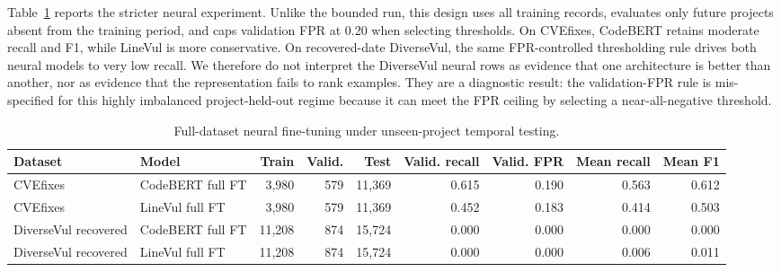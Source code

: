 \documentclass[a4paper,fleqn]{cas-dc}
\begin{document}
Table~\ref{tab:full-project-holdout} reports the stricter neural experiment.
Unlike the bounded run, this design uses all training records, evaluates only
future projects absent from the training period, and caps validation FPR at
0.20 when selecting thresholds. On CVEfixes, CodeBERT retains moderate recall
and F1, while LineVul is more conservative. On recovered-date DiverseVul, the
same FPR-controlled thresholding rule drives both neural models to very low
recall. We therefore do not interpret the DiverseVul neural rows as evidence
that one architecture is better than another, nor as evidence that the
representation fails to rank examples. They are a diagnostic result: the
validation-FPR rule is mis-specified for this highly imbalanced
project-held-out regime because it can meet the FPR ceiling by selecting a
near-all-negative threshold.

\begin{table}
\centering
\caption{Full-dataset neural fine-tuning under unseen-project temporal testing.}
\label{tab:full-project-holdout}
\scriptsize
\setlength{\tabcolsep}{3pt}
\begin{tabular}{llrrrrrrr}
\toprule
Dataset & Model & Train & Valid. & Test & Valid. recall & Valid. FPR & Mean recall & Mean F1 \\
\midrule
CVEfixes & CodeBERT full FT & 3,980 & 579 & 11,369 & 0.615 & 0.190 & 0.563 & 0.612 \\
CVEfixes & LineVul full FT & 3,980 & 579 & 11,369 & 0.452 & 0.183 & 0.414 & 0.503 \\
DiverseVul recovered & CodeBERT full FT & 11,208 & 874 & 15,724 & 0.000 & 0.000 & 0.000 & 0.000 \\
DiverseVul recovered & LineVul full FT & 11,208 & 874 & 15,724 & 0.000 & 0.000 & 0.006 & 0.011 \\
\bottomrule
\end{tabular}
\end{table}
\end{document}
